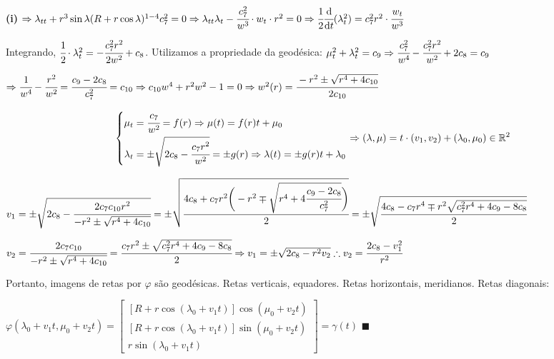 \documentclass[10pt,a4paper]{article}
\begin{document}
		\textbf{(i)} $\Rightarrow \lambda_{tt} + r^3 \sin \lambda (R + r \cos \lambda)^{1 - 4} c_7^2 = 0 \Rightarrow \lambda_{tt} \lambda_t - \cfrac{c_7^2}{w^3} \cdot w_t \cdot r^2 = 0 \Rightarrow \cfrac{1}{2} \cfrac{\mathrm{d}}{\mathrm{d}t} (\lambda_t^2) = c_7^2 r^2 \cdot \cfrac{w_t}{w^3}$

		Integrando, $\cfrac{1}{2} \cdot \lambda_t^2 = - \cfrac{c_7^2 r^2}{2w^2} + c_8$. Utilizamos a propriedade da geod\'esica: $\mu_t^2 + \lambda_t^2 = c_9 \Rightarrow \cfrac{c_7^2}{w^4} - \cfrac{c_7^2 r^2}{w^2} + 2c_8 = c_9$

		$\Rightarrow \cfrac{1}{w^4} - \cfrac{r^2}{w^2} = \cfrac{c_9 - 2c_8}{c_7^2} = c_{10} \Rightarrow c_{10} w^4 + r^2 w^2 - 1 = 0 \Rightarrow w^2(r) = \cfrac{-r^2 \pm \sqrt{r^4 + 4 c_{10}}}{2c_{10}}$

		\begin{equation*}
			\left\{\begin{aligned}
			    \mu_t &= \cfrac{c_7}{w^2} = f(r) \Rightarrow \mu(t) = f(r) t + \mu_0 \\
			    \lambda_t &= \pm \sqrt{2c_8 - \cfrac{c_7 r^2}{w^2}} = \pm g(r) \Rightarrow \lambda(t) = \pm g(r) t + \lambda_0
			\end{aligned}
			\right. \Rightarrow (\lambda, \mu) = t \cdot (v_1, v_2) + (\lambda_0, \mu_0) \in \mathbb{R}^2
		\end{equation*}

		$v_1 = \pm \sqrt{2c_8 - \cfrac{2c_7 c_{10} r^2}{-r^2 \pm \sqrt{r^4 + 4 c_{10}}}} = \pm \sqrt{\cfrac{4c_8 + c_7 r^2 \bigg(-r^2 \mp \sqrt{r^4 + 4 \cfrac{c_9 - 2c_8}{c_7^2}}\bigg)}{2}} = \pm \sqrt{\cfrac{4c_8 - c_7 r^4 \mp r^2 \sqrt{c_7^2 r^4 + 4 c_9 - 8c_8}}{2}}$

		$v_2 = \cfrac{2c_7c_{10}}{-r^2 \pm \sqrt{r^4 + 4 c_{10}}} = \cfrac{c_7 r^2 \pm \sqrt{c_7^2 r^4 + 4 c_9 - 8c_8}}{2} \Rightarrow v_1 = \pm \sqrt{2c_8 - r^2 v_2} \therefore v_2 = \cfrac{2c_8 - v_1^2}{r^2}$

		\vspace{3mm}

		Portanto, imagens de retas por $\varphi$ s\~ao geod\'esicas. Retas verticais, equadores. Retas horizontais, meridianos. Retas diagonais:

		$\varphi(\lambda_0 + v_1 t, \mu_0 + v_2 t) = \left[ \begin{matrix} [R + r \cos (\lambda_0 + v_1 t)] \cos (\mu_0 + v_2 t) \\ [R + r \cos (\lambda_0 + v_1 t)] \sin (\mu_0 + v_2 t) \\ r \sin (\lambda_0 + v_1 t) \end{matrix} \right] = \gamma(t)\,\,\blacksquare$
\end{document}
